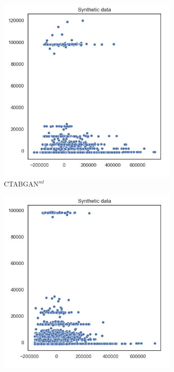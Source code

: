 \begin{figure}[H]
\begin{subfigure}{0.3\textwidth}
		\includegraphics[width=\textwidth]{images/pca/ctabgan.jpg}
		\caption{CTABGAN$^{ml}$}
	\end{subfigure}
	\begin{subfigure}{0.3\textwidth}
		\centering
		\includegraphics[width=\textwidth]{images/pca/ctabgan+.jpg}

\end{subfigure}
\end{figure}
